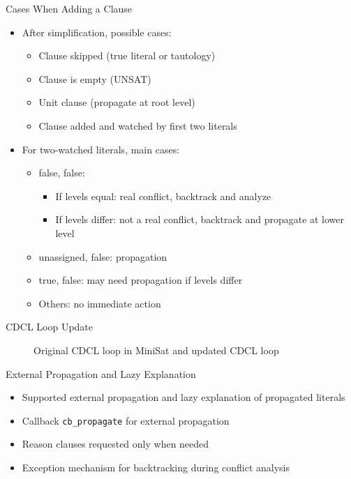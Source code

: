\documentclass{beamer}
\newcommand*{\code}[1]{\lstinline[basicstyle=\ttfamily, breaklines]|#1|}
\begin{document}
\begin{frame}{Cases When Adding a Clause}
  \begin{itemize}
    \item After simplification, possible cases:
    \begin{itemize}
      \item Clause skipped (true literal or tautology)
      \item Clause is empty (UNSAT)
      \item Unit clause (propagate at root level)
      \item Clause added and watched by first two literals
    \end{itemize}
    \item For two-watched literals, main cases:
    \begin{itemize}
      \item false, false:
        \begin{itemize}
          \item If levels equal: real conflict, backtrack and analyze
          \item If levels differ: not a real conflict, backtrack and propagate at lower level
        \end{itemize}
      \item unassigned, false: propagation
      \item true, false: may need propagation if levels differ
      \item Others: no immediate action
    \end{itemize}
  \end{itemize}
\end{frame}

\begin{frame}{CDCL Loop Update}
  \begin{figure}
    \centering
    
    \caption{Original CDCL loop in MiniSat and updated CDCL loop}
  \end{figure}
\end{frame}

\begin{frame}{External Propagation and Lazy Explanation}
  \begin{itemize}
    \item Supported external propagation and lazy explanation of propagated literals
    \item Callback \code{cb_propagate} for external propagation
    \item Reason clauses requested only when needed
    \item Exception mechanism for backtracking during conflict analysis
  \end{itemize}
\end{frame}
\end{document}
